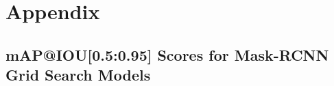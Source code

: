 \renewcommand{\thesection}{\Alph{section}} %
\renewcommand{\thesubsection}{\Alph{subsection}} %

\titleformat{\chapter}[display]
{\normalfont\huge\bfseries}{\chaptertitlename\ \thechapter}{20pt}{\Huge} %

\titlespacing*{\chapter}{0pt}{0pt}{20pt}
\chapter{Appendix} 
\titlespacing*{\chapter}{0pt}{50pt}{40pt}

\setcounter{section}{0} %
\setcounter{table}{0}
\renewcommand{\thetable}{\Alph{section}}

\section{mAP@IOU[0.5:0.95] Scores for Mask-RCNN Grid Search Models}\label{app:mAPScoresGridSearch}

